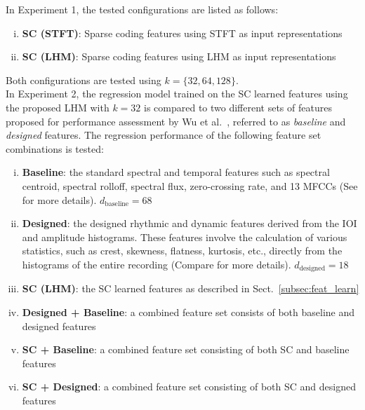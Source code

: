 \documentclass[conference]{IEEEtran}
\begin{document}
In Experiment 1, the tested configurations are listed as follows: %
\begin{enumerate}[(i)]
\item \textbf{SC (STFT)}: Sparse coding features using STFT as input representations
\item \textbf{SC (LHM)}: Sparse coding features using LHM as input representations 
\end{enumerate}
Both configurations are tested using $k = \{32, 64, 128\}$.\\

In Experiment 2, the regression model trained on the SC learned features using the proposed LHM with $k = 32$ is compared to two different sets of features proposed for performance assessment by Wu et al.\ \cite{Wu2016}, referred to as \textit{baseline} and \textit{designed} features. The regression performance of the following feature set combinations is tested:
\begin{enumerate}[(i)]
\item \textbf{Baseline}: the standard spectral and temporal features such as spectral centroid, spectral rolloff, spectral flux, zero-crossing rate, and 13 MFCCs (See \cite{Wu2016} for more details). $d_\mathrm{baseline} = 68$
\item \textbf{Designed}: the designed rhythmic and dynamic features derived from the IOI and amplitude histograms. These features involve the calculation of various statistics, such as crest, skewness, flatness, kurtosis, etc., directly from the histograms of the entire recording (Compare \cite{Wu2016} for more details). $d_\mathrm{designed} = 18$ 

\item \textbf{SC (LHM)}: the SC learned features as described in Sect.~\ref{subsec:feat_learn} %
\item \textbf{Designed + Baseline}: a combined feature set consists of both baseline and designed features %
\item \textbf{SC + Baseline}:  a combined feature set consisting of both SC and baseline features 
\item \textbf{SC + Designed}:  a combined feature set consisting of both SC and designed features 
\end{enumerate}
\end{document}

